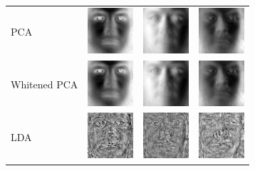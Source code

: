 \documentclass[10pt, a4paper]{article}
\begin{document}
\begin{figure}[h!]
\centering
\begin{tabular}{lccc}
PCA & \includegraphics{pie/pie_pca1} & \includegraphics{pie/pie_pca2} & \includegraphics{pie/pie_pca3} \\
Whitened PCA & \includegraphics{pie/pie_pca_white1} & \includegraphics{pie/pie_pca_white2} & \includegraphics{pie/pie_pca_white3} \\
LDA & \includegraphics{pie/pie_lda1} & \includegraphics{pie/pie_lda2} & \includegraphics{pie/pie_lda3} \\

\end{tabular}
\end{figure}
\end{document}
